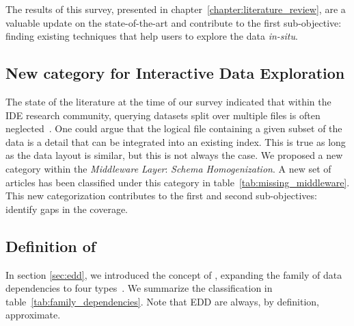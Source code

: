 The results of this survey, presented in chapter~\ref{chapter:literature_review}, are a valuable update on
the state-of-the-art and contribute to the first sub-objective: finding existing techniques that help users
to explore the data \emph{in-situ}.

\subsection{New category for Interactive Data Exploration}
The state of the literature at the time of our survey indicated that within the
\gls{IDE} research community, querying datasets split over multiple files is often
neglected~\cite{Silva2016}. One could argue that the logical file containing a given
subset of the data is a detail that can be integrated into an existing index. This is
true as long as the data layout is similar, but this is not always the case.
We proposed a new category within the \emph{Middleware Layer}: \emph{Schema Homogenization}.
A new set of articles has been classified under this category in table~\ref{tab:missing_middleware}.
This new categorization contributes to the first and second sub-objectives: identify gaps in the coverage.

\subsection{Definition of }
In section \ref{sec:edd}, we introduced the concept of , expanding
the family of data dependencies to four types~\cite{abedjan2015}. We
summarize the classification in table~\ref{tab:family_dependencies}.
Note that \gls{EDD} are always, by definition, approximate.

